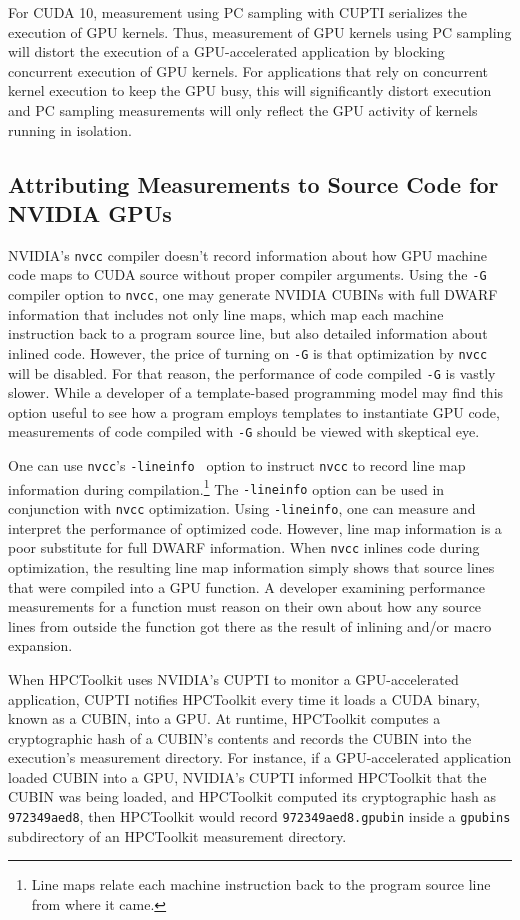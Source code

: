 For CUDA 10, measurement using PC sampling with CUPTI serializes the execution of GPU kernels. Thus, measurement of GPU kernels using PC sampling will distort the execution of a GPU-accelerated application by blocking concurrent execution of GPU kernels. For applications that rely on concurrent kernel execution to keep the GPU busy, this will significantly distort execution and PC sampling measurements will only reflect the GPU activity of kernels running in isolation.




\subsection{Attributing Measurements to Source Code for NVIDIA GPUs}

NVIDIA's {\tt nvcc} compiler doesn't record information about how GPU machine code maps to CUDA source without proper compiler arguments. Using the {\tt -G} compiler option to {\tt nvcc}, one may generate NVIDIA CUBINs with full DWARF information that includes not only line maps, which map each machine instruction back to a program source line, but also detailed information about inlined code. However, the price of turning on {\tt -G} is that optimization by {\tt nvcc} will be disabled. For that reason, the performance of code compiled {\tt -G} is vastly slower. While a developer of a template-based programming model may find this option useful to see how a program employs templates to instantiate GPU code, measurements of code compiled with {\tt -G} should be viewed with skeptical eye.

One can use {\tt nvcc}'s {\tt -lineinfo } option to instruct {\tt nvcc} to record line map information during compilation.\footnote{Line maps relate each machine instruction back to the program source line from where it came.} The {\tt -lineinfo} option can be used in conjunction with {\tt nvcc} optimization. Using {\tt -lineinfo}, one can measure and interpret the performance of optimized code. However, line map information is a poor substitute for full DWARF information. When {\tt nvcc} inlines code during optimization, the resulting line map information simply shows that source lines that were compiled into a GPU function. A developer examining performance measurements for a function must reason on their own about how any source lines from outside the function got there as the result of inlining and/or macro expansion.

When HPCToolkit uses NVIDIA's CUPTI to monitor a GPU-accelerated application, 
CUPTI notifies HPCToolkit every time it loads a CUDA binary, known as a CUBIN, into a GPU.
At runtime, HPCToolkit computes a cryptographic hash of a CUBIN's contents and records the CUBIN into the execution's measurement directory. 
For instance, if a GPU-accelerated application loaded CUBIN into a GPU, NVIDIA's CUPTI informed HPCToolkit that the CUBIN was being loaded, and HPCToolkit computed its cryptographic hash as {\tt 972349aed8}, then HPCToolkit would record {\tt 972349aed8.gpubin} inside a {\tt gpubins} subdirectory of an HPCToolkit measurement directory.

